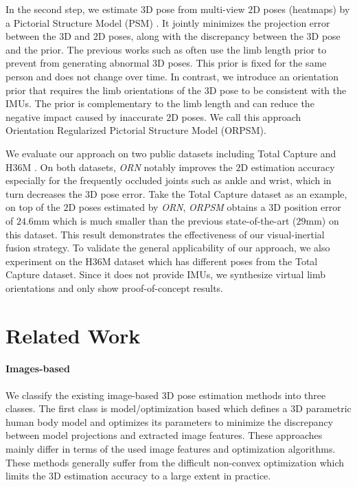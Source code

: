 \documentclass[10pt,twocolumn,letterpaper]{article}
\begin{document}
In the second step, we estimate $3$D pose from multi-view $2$D poses (heatmaps) by a Pictorial Structure Model (PSM) \cite{kostrikov2014depth,PavlakosZDD17,belagiannis20143D}. It jointly minimizes the projection error between the $3$D and $2$D poses, along with the discrepancy between the $3$D pose and the prior. The previous works such as \cite{PavlakosZDD17,qiu2019cross} often use the limb length prior to prevent from generating  abnormal $3$D poses. This prior is fixed for the same person and does not change over time. In contrast, we introduce an orientation prior that requires the limb orientations of the $3$D pose to be consistent with the IMUs. The prior is complementary to the limb length and can reduce the negative impact caused by inaccurate $2$D poses. We call this approach Orientation Regularized Pictorial Structure Model (ORPSM).



We evaluate our approach on two public datasets including Total Capture \cite{trumble2017total} and H36M \cite{ionescu2014human3}. On both datasets, \emph{ORN} notably improves the $2$D estimation accuracy especially for the frequently occluded joints such as ankle and wrist, which in turn decreases the $3$D pose error. Take the Total Capture dataset as an example, on top of the $2$D poses estimated by \emph{ORN}, \emph{ORPSM} obtains a $3$D position error of $24.6$mm which is much smaller than the previous state-of-the-art \cite{qiu2019cross} ($29$mm) on this dataset. This result demonstrates the effectiveness of our visual-inertial fusion strategy. To validate the general applicability of our approach, we also experiment on the H36M dataset which has different poses from the Total Capture dataset. Since it does not provide IMUs, we synthesize virtual limb orientations and only show proof-of-concept results. 



\section{Related Work}
\paragraph{Images-based}

We classify the existing image-based $3$D pose estimation methods into three classes. The first class is model/optimization based \cite{gall2010optimization,liu2011markerless} which defines a $3$D parametric human body model and optimizes its parameters to minimize the discrepancy between model projections and extracted image features. These approaches mainly differ in terms of the used image features and optimization algorithms. These methods generally suffer from the difficult non-convex optimization which limits the $3$D estimation accuracy to a large extent in practice.
\end{document}
